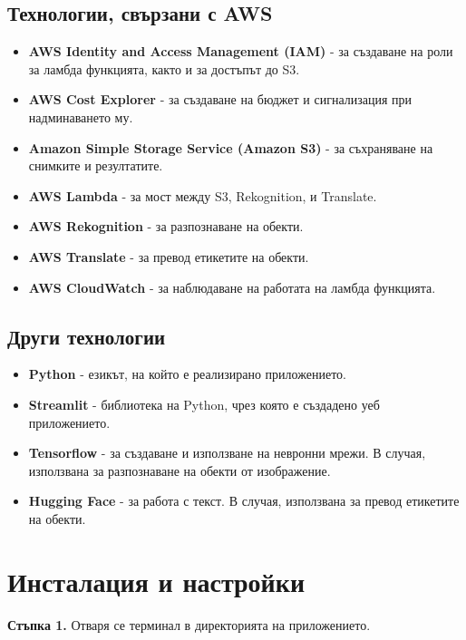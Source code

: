 \documentclass[12pt]{article}
\begin{document}
\subsection{Технологии, свързани с AWS}

\begin{itemize}
    \item \textbf{AWS Identity and Access Management (IAM)} - за създаване на роли за ламбда функцията, както и за достъпът до S3.
    \item \textbf{AWS Cost Explorer} - за създаване на бюджет и сигнализация при надминаването му.
    \item \textbf{Amazon Simple Storage Service (Amazon S3)} - за съхраняване на снимките и резултатите.
    \item \textbf{AWS Lambda} - за мост между S3, Rekognition, и Translate.
    \item \textbf{AWS Rekognition} - за разпознаване на обекти.
    \item \textbf{AWS Translate} - за превод етикетите на обекти.
    \item \textbf{AWS CloudWatch} - за наблюдаване на работата на ламбда функцията.
\end{itemize}

\subsection{Други технологии}

\begin{itemize}
    \item \textbf{Python} - езикът, на който е реализирано приложението.
    \item \textbf{Streamlit} - библиотека на Python, чрез която е създадено уеб приложението.
    \item \textbf{Tensorflow} - за създаване и използване на невронни мрежи. В случая, използвана за разпознаване на обекти от изображение.
    \item \textbf{Hugging Face} - за работа с текст. В случая, използвана за превод етикетите на обекти.
\end{itemize}

\section{Инсталация и настройки}
\noindent\textbf{Стъпка 1.} Отваря се терминал в директорията на приложението.

\medskip
\end{document}
